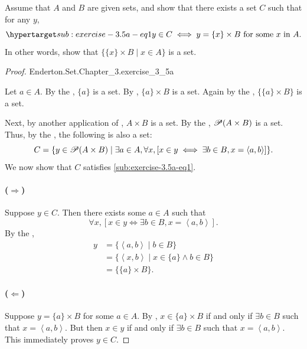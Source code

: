 \documentclass{report}
\newcommand{\pair}[1]{\left< #1 \right>}
\begin{document}
Assume that $A$ and $B$ are given sets, and show that there exists a set $C$
  such that for any $y$,
  \begin{equation}
    \hyperlabel{sub:exercise-3.5a-eq1}
    y \in C \iff y = \{x\} \times B \text{ for some } x \text{ in } A.
  \end{equation}
In other words, show that $\{\{x\} \times B \mid x \in A\}$ is a set.

\begin{proof}

    {Enderton.Set.Chapter\_3.exercise\_3\_5a}

  Let $a \in A$.
  By the , $\{a\}$ is a set.
  By , $\{a\} \times B$ is a set.
  Again by the , $\{\{a\} \times B\}$ is a set.

  Next, by another application of , $A \times B$
    is a set.
  By the , $\mathscr{P}(A \times B)$ is a set.
  Thus, by the , the following is also a set:
    $$C = \{ y \in \powerset{(A \times B)} \mid
      \exists a \in A, \forall x, \left[ x \in y \iff
        \exists b \in B, x = \pair{a, b} \right] \}.$$
  We now show that $C$ satisfies \eqref{sub:exercise-3.5a-eq1}.

  \paragraph{($\Rightarrow$)}%

    Suppose $y \in C$.
    Then there exists some $a \in A$ such that
      $$\forall x, \left[ x \in y \iff
        \exists b \in B, x = \pair{a, b} \right].$$
    By the ,
      \begin{align*}
        y
          & = \{ \pair{a, b} \mid b \in B \} \\
          & = \{ \pair{x, b} \mid x \in \{a\} \land b \in B \} \\
          & = \{ \{a\} \times B \}.
      \end{align*}

  \paragraph{($\Leftarrow$)}%

    Suppose $y = \{a\} \times B$ for some $a \in A$.
    By , $x \in \{a\} \times B$ if and only if
      $\exists b \in B$ such that $x = \pair{a, b}$.
    But then $x \in y$ if and only if $\exists b \in B$ such that
      $x = \pair{a, b}$.
    This immediately proves $y \in C$.

\end{proof}
\end{document}
